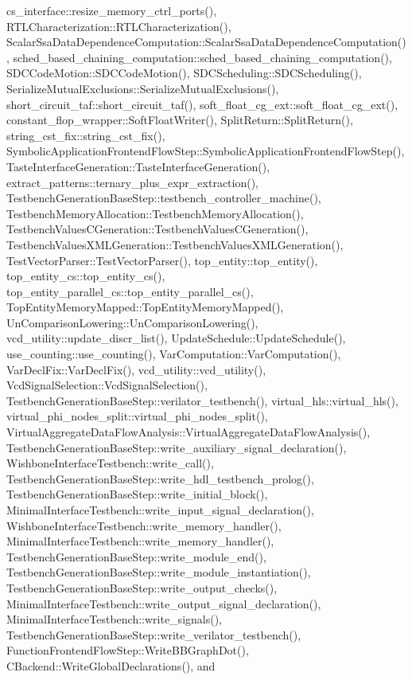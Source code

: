 cs\+\_\+interface\+::resize\+\_\+memory\+\_\+ctrl\+\_\+ports(), R\+T\+L\+Characterization\+::\+R\+T\+L\+Characterization(), Scalar\+Ssa\+Data\+Dependence\+Computation\+::\+Scalar\+Ssa\+Data\+Dependence\+Computation(), sched\+\_\+based\+\_\+chaining\+\_\+computation\+::sched\+\_\+based\+\_\+chaining\+\_\+computation(), S\+D\+C\+Code\+Motion\+::\+S\+D\+C\+Code\+Motion(), S\+D\+C\+Scheduling\+::\+S\+D\+C\+Scheduling(), Serialize\+Mutual\+Exclusions\+::\+Serialize\+Mutual\+Exclusions(), short\+\_\+circuit\+\_\+taf\+::short\+\_\+circuit\+\_\+taf(), soft\+\_\+float\+\_\+cg\+\_\+ext\+::soft\+\_\+float\+\_\+cg\+\_\+ext(), constant\+\_\+flop\+\_\+wrapper\+::\+Soft\+Float\+Writer(), Split\+Return\+::\+Split\+Return(), string\+\_\+cst\+\_\+fix\+::string\+\_\+cst\+\_\+fix(), Symbolic\+Application\+Frontend\+Flow\+Step\+::\+Symbolic\+Application\+Frontend\+Flow\+Step(), Taste\+Interface\+Generation\+::\+Taste\+Interface\+Generation(), extract\+\_\+patterns\+::ternary\+\_\+plus\+\_\+expr\+\_\+extraction(), Testbench\+Generation\+Base\+Step\+::testbench\+\_\+controller\+\_\+machine(), Testbench\+Memory\+Allocation\+::\+Testbench\+Memory\+Allocation(), Testbench\+Values\+C\+Generation\+::\+Testbench\+Values\+C\+Generation(), Testbench\+Values\+X\+M\+L\+Generation\+::\+Testbench\+Values\+X\+M\+L\+Generation(), Test\+Vector\+Parser\+::\+Test\+Vector\+Parser(), top\+\_\+entity\+::top\+\_\+entity(), top\+\_\+entity\+\_\+cs\+::top\+\_\+entity\+\_\+cs(), top\+\_\+entity\+\_\+parallel\+\_\+cs\+::top\+\_\+entity\+\_\+parallel\+\_\+cs(), Top\+Entity\+Memory\+Mapped\+::\+Top\+Entity\+Memory\+Mapped(), Un\+Comparison\+Lowering\+::\+Un\+Comparison\+Lowering(), vcd\+\_\+utility\+::update\+\_\+discr\+\_\+list(), Update\+Schedule\+::\+Update\+Schedule(), use\+\_\+counting\+::use\+\_\+counting(), Var\+Computation\+::\+Var\+Computation(), Var\+Decl\+Fix\+::\+Var\+Decl\+Fix(), vcd\+\_\+utility\+::vcd\+\_\+utility(), Vcd\+Signal\+Selection\+::\+Vcd\+Signal\+Selection(), Testbench\+Generation\+Base\+Step\+::verilator\+\_\+testbench(), virtual\+\_\+hls\+::virtual\+\_\+hls(), virtual\+\_\+phi\+\_\+nodes\+\_\+split\+::virtual\+\_\+phi\+\_\+nodes\+\_\+split(), Virtual\+Aggregate\+Data\+Flow\+Analysis\+::\+Virtual\+Aggregate\+Data\+Flow\+Analysis(), Testbench\+Generation\+Base\+Step\+::write\+\_\+auxiliary\+\_\+signal\+\_\+declaration(), Wishbone\+Interface\+Testbench\+::write\+\_\+call(), Testbench\+Generation\+Base\+Step\+::write\+\_\+hdl\+\_\+testbench\+\_\+prolog(), Testbench\+Generation\+Base\+Step\+::write\+\_\+initial\+\_\+block(), Minimal\+Interface\+Testbench\+::write\+\_\+input\+\_\+signal\+\_\+declaration(), Wishbone\+Interface\+Testbench\+::write\+\_\+memory\+\_\+handler(), Minimal\+Interface\+Testbench\+::write\+\_\+memory\+\_\+handler(), Testbench\+Generation\+Base\+Step\+::write\+\_\+module\+\_\+end(), Testbench\+Generation\+Base\+Step\+::write\+\_\+module\+\_\+instantiation(), Testbench\+Generation\+Base\+Step\+::write\+\_\+output\+\_\+checks(), Minimal\+Interface\+Testbench\+::write\+\_\+output\+\_\+signal\+\_\+declaration(), Minimal\+Interface\+Testbench\+::write\+\_\+signals(), Testbench\+Generation\+Base\+Step\+::write\+\_\+verilator\+\_\+testbench(), Function\+Frontend\+Flow\+Step\+::\+Write\+B\+B\+Graph\+Dot(), C\+Backend\+::\+Write\+Global\+Declarations(), and 